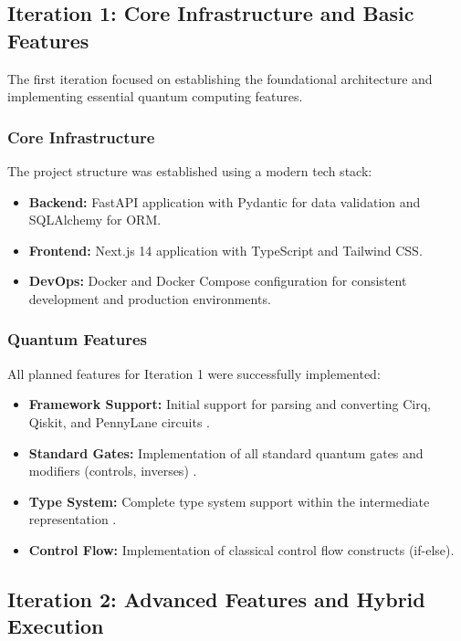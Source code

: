 \subsection{Iteration 1: Core Infrastructure and Basic Features}

The first iteration focused on establishing the foundational architecture and implementing essential quantum computing features.

\subsubsection{Core Infrastructure}
The project structure was established using a modern tech stack:
\begin{itemize}
    \item \textbf{Backend:} FastAPI application with Pydantic for data validation and SQLAlchemy for ORM.
    \item \textbf{Frontend:} Next.js 14 application with TypeScript and Tailwind CSS.
    \item \textbf{DevOps:} Docker and Docker Compose configuration for consistent development and production environments.
\end{itemize}

\subsubsection{Quantum Features}
All planned features for Iteration 1 were successfully implemented:
\begin{itemize}
    \item \textbf{Framework Support:} Initial support for parsing and converting Cirq, Qiskit, and PennyLane circuits \cite{qiskit, cirq_developers_2023, bergholm2018pennylane}.
    \item \textbf{Standard Gates:} Implementation of all standard quantum gates and modifiers (controls, inverses) \cite{nielsen2010quantum}.
    \item \textbf{Type System:} Complete type system support within the intermediate representation \cite{cross2021openqasm}.
    \item \textbf{Control Flow:} Implementation of classical control flow constructs (if-else).
\end{itemize}

\subsection{Iteration 2: Advanced Features and Hybrid Execution}

